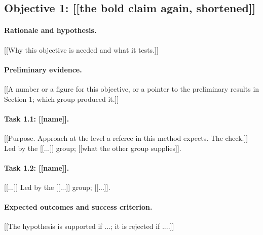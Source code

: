 \documentclass[12pt,a4paper]{article}
\begin{document}
\subsection{Objective 1: [[the bold claim again, shortened]]}

\paragraph{Rationale and hypothesis.} [[Why this objective is needed and what it tests.]]

\paragraph{Preliminary evidence.} [[A number or a figure for this objective, or a pointer to
the preliminary results in Section 1; which group produced it.]]

\paragraph{Task 1.1: [[name]].} [[Purpose. Approach at the level a referee in this method
expects. The check.]] Led by the [[...]] group; [[what the other group supplies]].

\paragraph{Task 1.2: [[name]].} [[...]] Led by the [[...]] group; [[...]].

\paragraph{Expected outcomes and success criterion.} [[The hypothesis is supported if ...;
it is rejected if ....]]
\end{document}
